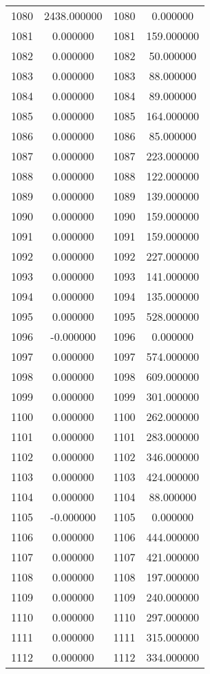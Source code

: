 \documentclass[12pt]{article}
\begin{document}
\begin{longtable}{@{}cccc@{}}
1080 & 2438.000000 & 1080 & 0.000000 \\
1081 & 0.000000 & 1081 & 159.000000 \\
1082 & 0.000000 & 1082 & 50.000000 \\
1083 & 0.000000 & 1083 & 88.000000 \\
1084 & 0.000000 & 1084 & 89.000000 \\
1085 & 0.000000 & 1085 & 164.000000 \\
1086 & 0.000000 & 1086 & 85.000000 \\
1087 & 0.000000 & 1087 & 223.000000 \\
1088 & 0.000000 & 1088 & 122.000000 \\
1089 & 0.000000 & 1089 & 139.000000 \\
1090 & 0.000000 & 1090 & 159.000000 \\
1091 & 0.000000 & 1091 & 159.000000 \\
1092 & 0.000000 & 1092 & 227.000000 \\
1093 & 0.000000 & 1093 & 141.000000 \\
1094 & 0.000000 & 1094 & 135.000000 \\
1095 & 0.000000 & 1095 & 528.000000 \\
1096 & -0.000000 & 1096 & 0.000000 \\
1097 & 0.000000 & 1097 & 574.000000 \\
1098 & 0.000000 & 1098 & 609.000000 \\
1099 & 0.000000 & 1099 & 301.000000 \\
1100 & 0.000000 & 1100 & 262.000000 \\
1101 & 0.000000 & 1101 & 283.000000 \\
1102 & 0.000000 & 1102 & 346.000000 \\
1103 & 0.000000 & 1103 & 424.000000 \\
1104 & 0.000000 & 1104 & 88.000000 \\
1105 & -0.000000 & 1105 & 0.000000 \\
1106 & 0.000000 & 1106 & 444.000000 \\
1107 & 0.000000 & 1107 & 421.000000 \\
1108 & 0.000000 & 1108 & 197.000000 \\
1109 & 0.000000 & 1109 & 240.000000 \\
1110 & 0.000000 & 1110 & 297.000000 \\
1111 & 0.000000 & 1111 & 315.000000 \\
1112 & 0.000000 & 1112 & 334.000000 \\

\end{longtable}
\end{document}
